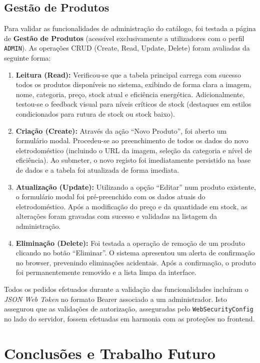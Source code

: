 \documentclass[11pt,a4paper,oneside]{report}
\begin{document}
\section{Gestão de Produtos}
Para validar as funcionalidades de administração do catálogo, foi testada a página de \textbf{Gestão de Produtos} (acessível exclusivamente a utilizadores com o perfil \texttt{ADMIN}). As operações CRUD (Create, Read, Update, Delete) foram avaliadas da seguinte forma:
\begin{enumerate}
    \item \textbf{Leitura (Read):} Verificou-se que a tabela principal carrega com sucesso todos os produtos disponíveis no sistema, exibindo de forma clara a imagem, nome, categoria, preço, stock atual e eficiência energética. Adicionalmente, testou-se o feedback visual para níveis críticos de stock (destaques em estilos condicionados para rutura de stock ou stock baixo).
    \item \textbf{Criação (Create):} Através da ação ``Novo Produto'', foi aberto um formulário modal. Procedeu-se ao preenchimento de todos os dados do novo eletrodoméstico (incluindo o URL da imagem, seleção da categoria e nível de eficiência). Ao submeter, o novo registo foi imediatamente persistido na base de dados e a tabela foi atualizada de forma imediata.
    \item \textbf{Atualização (Update):} Utilizando a opção ``Editar'' num produto existente, o formulário modal foi pré-preenchido com os dados atuais do eletrodoméstico. Após a modificação do preço e da quantidade em stock, as alterações foram gravadas com sucesso e validadas na listagem da administração.
    \item \textbf{Eliminação (Delete):} Foi testada a operação de remoção de um produto clicando no botão ``Eliminar''. O sistema apresentou um alerta de confirmação no browser, prevenindo eliminações acidentais. Após a confirmação, o produto foi permanentemente removido e a lista limpa da interface.
\end{enumerate}
Todos os pedidos efetuados durante a validação das funcionalidades incluíram o \textit{JSON Web Token} no formato Bearer associado a um administrador. Isto assegurou que as validações de autorização, asseguradas pelo \texttt{WebSecurityConfig} no lado do servidor, fossem efetuadas em harmonia com as proteções no frontend.

\clearpage

\chapter{Conclusões e Trabalho Futuro}
\end{document}
